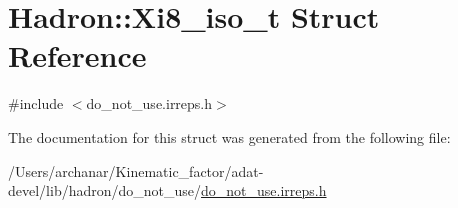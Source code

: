 \hypertarget{structHadron_1_1Xi8__iso__t}{}\section{Hadron\+:\+:Xi8\+\_\+iso\+\_\+t Struct Reference}
\label{structHadron_1_1Xi8__iso__t}


{\ttfamily \#include $<$do\+\_\+not\+\_\+use.\+irreps.\+h$>$}



The documentation for this struct was generated from the following file\+:\begin{DoxyCompactItemize}
\item 
/\+Users/archanar/\+Kinematic\+\_\+factor/adat-\/devel/lib/hadron/do\+\_\+not\+\_\+use/\mbox{\hyperlink{adat-devel_2lib_2hadron_2do__not__use_2do__not__use_8irreps_8h}{do\+\_\+not\+\_\+use.\+irreps.\+h}}\end{DoxyCompactItemize}
